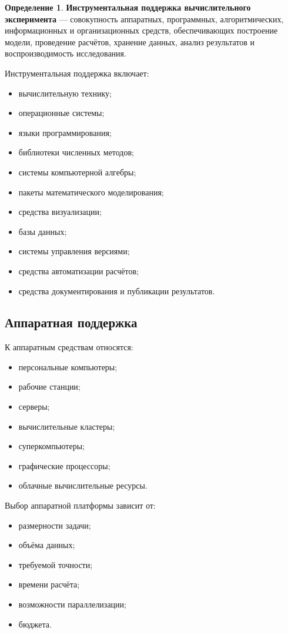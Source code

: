 \documentclass[12pt,a4paper]{article}
\theoremstyle{definition}
\newtheorem{definition}{Определение}
\theoremstyle{plain}
\begin{document}
\begin{definition}
\textbf{Инструментальная поддержка вычислительного эксперимента} --- совокупность аппаратных, программных, алгоритмических, информационных и организационных средств, обеспечивающих построение модели, проведение расчётов, хранение данных, анализ результатов и воспроизводимость исследования.
\end{definition}

Инструментальная поддержка включает:
\begin{itemize}
    \item вычислительную технику;
    \item операционные системы;
    \item языки программирования;
    \item библиотеки численных методов;
    \item системы компьютерной алгебры;
    \item пакеты математического моделирования;
    \item средства визуализации;
    \item базы данных;
    \item системы управления версиями;
    \item средства автоматизации расчётов;
    \item средства документирования и публикации результатов.
\end{itemize}

\subsection{Аппаратная поддержка}

К аппаратным средствам относятся:
\begin{itemize}
    \item персональные компьютеры;
    \item рабочие станции;
    \item серверы;
    \item вычислительные кластеры;
    \item суперкомпьютеры;
    \item графические процессоры;
    \item облачные вычислительные ресурсы.
\end{itemize}

Выбор аппаратной платформы зависит от:
\begin{itemize}
    \item размерности задачи;
    \item объёма данных;
    \item требуемой точности;
    \item времени расчёта;
    \item возможности параллелизации;
    \item бюджета.
\end{itemize}
\end{document}
